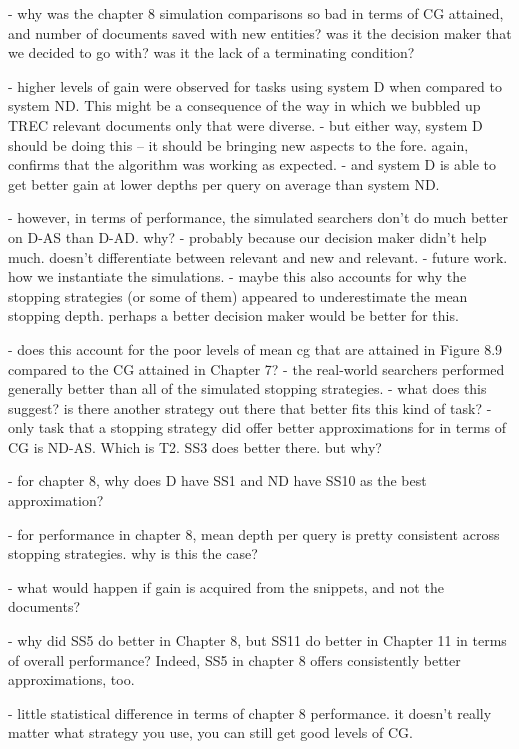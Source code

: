 - why was the chapter 8 simulation comparisons so bad in terms of CG attained, and number of documents saved with new entities? was it the decision maker that we decided to go with? was it the lack of a terminating condition?

- higher levels of gain were observed for tasks using system D when compared to system ND. This might be a consequence of the way in which we bubbled up TREC relevant documents only that were diverse.
    - but either way, system D should be doing this -- it should be bringing new aspects to the fore. again, confirms that the algorithm was working as expected.
    - and system D is able to get better gain at lower depths per query on average than system ND.

- however, in terms of performance, the simulated searchers don't do much better on D-AS than D-AD. why?
    - probably because our decision maker didn't help much. doesn't differentiate between relevant and new and relevant.
    - future work. how we instantiate the simulations.
    - maybe this also accounts for why the stopping strategies (or some of them) appeared to underestimate the mean stopping depth. perhaps a better decision maker would be better for this. 

- does this account for the poor levels of mean cg that are attained in Figure 8.9 compared to the CG attained in Chapter 7?
    - the real-world searchers performed generally better than all of the simulated stopping strategies.
        - what does this suggest? is there another strategy out there that better fits this kind of task?
        - only task that a stopping strategy did offer better approximations for in terms of CG is ND-AS. Which is T2. SS3 does better there. but why?
        
- for chapter 8, why does D have SS1 and ND have SS10 as the best approximation?

- for performance in chapter 8, mean depth per query is pretty consistent across stopping strategies. why is this the case?

- what would happen if gain is acquired from the snippets, and not the documents?

- why did SS5 do better in Chapter 8, but SS11 do better in Chapter 11 in terms of overall performance? Indeed, SS5 in chapter 8 offers consistently better approximations, too.

- little statistical difference in terms of chapter 8 performance. it doesn't really matter what strategy you use, you can still get good levels of CG.

